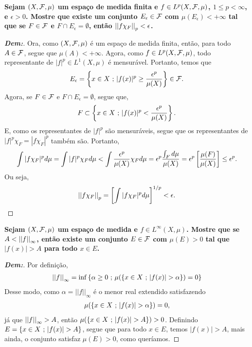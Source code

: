 \textbf{Sejam $(X, \mcal F, \mu)$ um espaço de medida finita e $f \in L^p(X, \mcal F, \mu)$, $1 \le p < \infty$, 
e $\epsilon > 0$. Mostre que existe um conjunto $E_\epsilon \in \mcal F$ com $\mu(E_\epsilon) < +\infty$ 
tal que se $F \in \mcal F$ e $F \cap E_\epsilon = \emptyset$, então $\pnorm p {f \chi_F} < \epsilon$.}
\begin{proof}[\textbf{Dem:}] Ora, como $(X, \mcal F, \mu)$ é um espaço de medida finita, então, 
  para todo $A \in \mcal F$, segue que $\mu(A) < +\infty$. Agora, como $f \in L^p(X, \mcal F, \mu)$, 
  todo representante de $|f|^p \in L^1(X, \mu)$ é mensurável. Portanto, temos que 
  \begin{align*}
    E_\epsilon = \set{x \in X \st |f(x)|^p \ge \frac{\epsilon^p}{\mu(X)}} \in \mcal F.
  \end{align*}
  Agora, se $F \in \mcal F$ e $F \cap E_\epsilon = \emptyset$, segue que, 
  \begin{align*}
    F \subset \set{x \in X \st |f(x)|^p < \frac{\epsilon^p}{\mu(X)}}.
  \end{align*}
  E, como os representantes de $|f|^p$ são 
  mensuráveis, segue que os representantes de $|f|^p\chi_F = |f \chi_F|^p$ também são. Portanto, 
  \begin{align*}
    \int |f \chi_F|^p d\mu = \int | f |^p \chi_F d\mu < \int \frac{\epsilon^p}{\mu(X)} \chi_F d\mu 
    = \epsilon^p \frac{\int_F d\mu}{\mu(X)} = \epsilon^p \cparth{\frac{\mu(F)}{\mu(X)}} \le \epsilon^p.
  \end{align*}
Ou seja, 
\begin{align*}
  \pnorm p {f\chi_F} = \cparth{\int |f\chi_F|^p d\mu}^{1/p} < \epsilon.
\end{align*}
\end{proof}

\textbf{Sejam $(X, \mcal F, \mu)$ um espaço de medida e $f \in L^\infty(X, \mu)$. 
Mostre que se $A < \pnorm \infty f$, então existe um conjunto 
$E \in \mcal F$ com $\mu(E) > 0$ tal que $|f(x)| > A$ para todo $x \in E$.}
\begin{proof}[\textbf{Dem:}] Por definição, 
  \begin{align*}
    \pnorm \infty f = \inf \set{\alpha \ge 0 \st \mu(\set{x \in X \st |f(x)| > \alpha}) = 0}
  \end{align*}  
  Desse modo, como $\alpha = ||f||_\infty$ é o menor real extendido satisfazendo 
  \begin{align*}
    \mu(\set{x \in X \st |f(x)| > \alpha}) = 0,
  \end{align*}
  já que $\pnorm \infty f > A$, então $\mu(\set{x \in X \st |f(x)| > A}) > 0$. Definindo 
  $E = \set{x \in X \st |f(x)| > A}$, segue que para todo $x \in E$, temos $|f(x)| > A$,
  mais ainda, o conjunto satisfaz $\mu(E) > 0$, como queríamos.
\end{proof}

